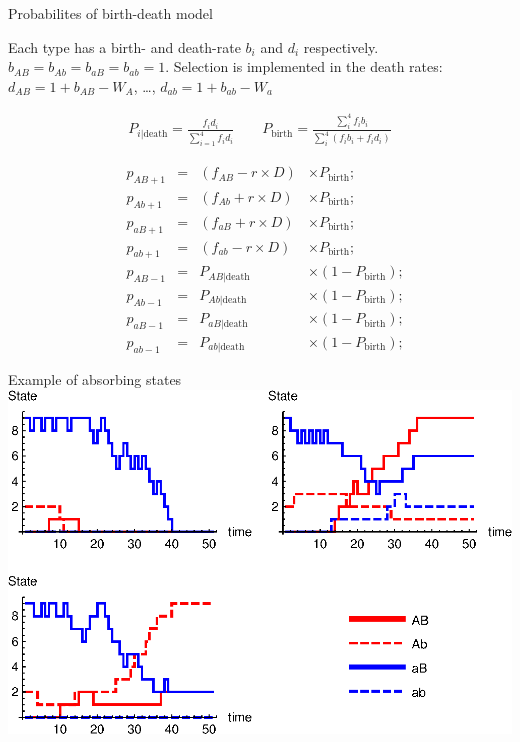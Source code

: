 \documentclass{beamer}
\begin{document}
\begin{frame}{Probabilites of birth-death model}

\footnotesize
Each type has a birth- and death-rate $b_i$ and $d_i$ respectively. $b_{AB}=b_{Ab}=b_{aB}=b_{ab} =1$. Selection is implemented in the death rates: $d_{AB} = 1+b_{AB}-W_A$, \dots,  $d_{ab} = 1+b_{ab}-W_a$

    \begin{equation*}
    \begin{aligned}
        P_{i|\text{death}}=\frac{f_id_i}{\sum_{i=1}^4 f_id_i} \qquad P_\text{birth} = \frac{\sum_i^4 f_i b_i}{\sum_i^4 (f_i b_i + f_i d_i)} 
    \end{aligned}
    \end{equation*}
    
    \begin{equation*}
    \begin{aligned}
        &p_{AB+1} & =& (f_{AB}-r\times D) & \times P_\text{birth};\\
        &p_{Ab+1} & =& (f_{Ab}+r\times D) & \times P_\text{birth};\\
        &p_{aB+1} & =& (f_{aB}+r\times D) & \times P_\text{birth};\\
        &p_{ab+1} & =& (f_{ab}-r\times D) & \times P_\text{birth};\\
        &p_{AB-1} & =& P_{AB|\text{death}} & \times (1-P_\text{birth}); \\
        &p_{Ab-1} & =& P_{Ab|\text{death}} & \times (1-P_\text{birth}); \\
        &p_{aB-1} & =& P_{aB|\text{death}} & \times (1-P_\text{birth}); \\
        &p_{ab-1} & =& P_{ab|\text{death}} & \times (1-P_\text{birth}); 
    \end{aligned}
    \end{equation*} 

    
\normalsize
 
\end{frame}

\begin{frame}{Example of absorbing states}
    \includegraphics[width=1.0\textwidth]{Matlab/Figures/gridplot.eps}
\end{frame}
\end{document}
